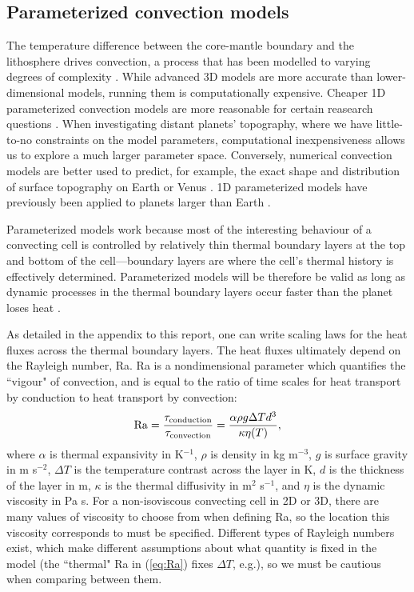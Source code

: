 \subsection{Parameterized convection models}

The temperature difference between the core-mantle boundary and the lithosphere drives convection, a process that has been modelled to varying degrees of complexity \citep[e.g.,][]{McKenzie1974, Nakagawa2015}. While advanced 3D models are more accurate than lower-dimensional models, running them is computationally expensive. Cheaper 1D parameterized convection models are more reasonable for certain reasearch questions \citep{Sharpe1979, Schubert1980, Davies1980}. When investigating distant planets' topography, where we have little-to-no constraints on the model parameters, computational inexpensiveness allows us to explore a much larger parameter space. Conversely, numerical convection models are better used to predict, for example, the exact shape and distribution of surface topography on Earth or Venus \citep[e.g.,][]{Moresi1995, Vezolainen2004}. 1D parameterized models have previously been applied to planets larger than Earth \citep{Valencia2009, Stamenkovic2012}.

Parameterized models work because most of the interesting behaviour of a convecting cell is controlled by relatively thin thermal boundary layers at the top and bottom of the cell---boundary layers are where the cell's thermal history is effectively determined. Parameterized models will be therefore be valid as long as dynamic processes in the thermal boundary layers occur faster than the planet loses heat \citep{Sharpe1979, Korenaga2008a}. 

As detailed in the appendix to this report, one can write scaling laws for the heat fluxes across the thermal boundary layers. The heat fluxes ultimately depend on the Rayleigh number, Ra. Ra is a nondimensional parameter which quantifies the ``vigour" of convection, and is equal to the ratio of time scales for heat transport by conduction to heat transport by convection:
\begin{equation}\label{eq:Ra}
\mathrm{Ra} = \frac{\tau_{\rm conduction}}{\tau_{\rm convection}}= \frac{\alpha \rho g \Delta T d^3 }{ \kappa \eta(T)},
\end{equation}
where $\alpha$ is thermal expansivity in K$^{-1}$, $\rho$ is density in kg m$^{-3}$, $g$ is surface gravity in m s$^{-2}$, $\Delta T$ is the temperature contrast across the layer in K, $d$ is the thickness of the layer in m, $\kappa$ is the thermal diffusivity in m$^{2}$ s$^{-1}$, and $\eta$ is the dynamic viscosity in Pa s. For a non-isoviscous convecting cell in 2D or 3D, there are many values of viscosity to choose from when defining Ra, so the location this viscosity corresponds to must be specified. Different types of Rayleigh numbers exist, which make different assumptions about what quantity is fixed in the model (the ``thermal" Ra in (\ref{eq:Ra}) fixes $\Delta T$, e.g.), so we must be cautious when comparing between them.

